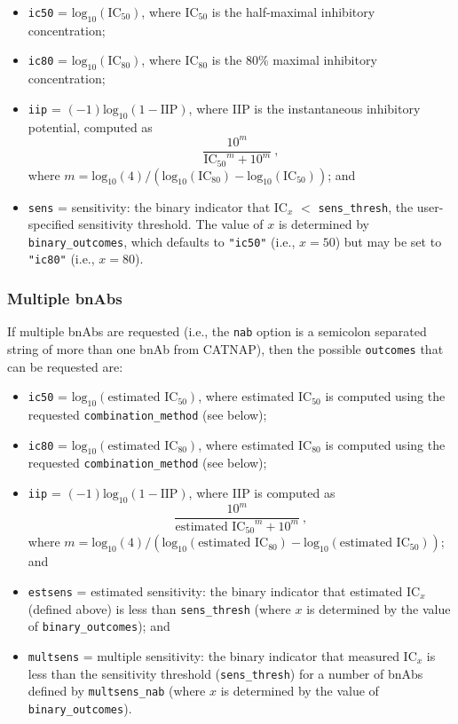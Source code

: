 \documentclass[
]{article}
\providecommand{\tightlist}{%
  \setlength{\itemsep}{0pt}\setlength{\parskip}{0pt}}
\begin{document}
\begin{itemize}
\tightlist
\item
  \texttt{ic50} = \(\mbox{log}_{10}(\mbox{IC}_{50})\), where IC\(_{50}\) is the half-maximal inhibitory concentration;
\item
  \texttt{ic80} = \(\mbox{log}_{10}(\mbox{IC}_{80})\), where IC\(_{80}\) is the 80\% maximal inhibitory concentration;
\item
  \texttt{iip} = \((-1)\mbox{log}_{10}(1 - \mbox{IIP})\), where IIP \citep[\citet{wagh2016optimal}]{shen2008dose} is the instantaneous inhibitory potential, computed as \[ \frac{10^m}{\mbox{IC$_{50}$}^m + 10^m} \ , \] where \(m = \mbox{log}_{10}(4) / (\mbox{log}_{10}(\mbox{IC}_{80}) - \mbox{log}_{10}(\mbox{IC}_{50}))\); and
\item
  \texttt{sens} = sensitivity: the binary indicator that IC\(_{x}\) \(<\) \texttt{sens\_thresh}, the user-specified sensitivity threshold. The value of \(x\) is determined by \texttt{binary\_outcomes}, which defaults to \texttt{"ic50"} (i.e., \(x = 50\)) but may be set to \texttt{"ic80"} (i.e., \(x = 80\)).
\end{itemize}

\hypertarget{multiple-bnabs}{%
\subsubsection{Multiple bnAbs}\label{multiple-bnabs}}

If multiple bnAbs are requested (i.e., the \texttt{nab} option is a semicolon separated string of more than one bnAb from CATNAP), then the possible \texttt{outcomes} that can be requested are:

\begin{itemize}
\tightlist
\item
  \texttt{ic50} = \(\mbox{log}_{10}(\mbox{estimated IC}_{50})\), where estimated IC\(_{50}\) is computed using the requested \texttt{combination\_method} (see below);
\item
  \texttt{ic80} = \(\mbox{log}_{10}(\mbox{estimated IC}_{80})\), where estimated IC\(_{80}\) is computed using the requested \texttt{combination\_method} (see below);
\item
  \texttt{iip} = \((-1)\mbox{log}_{10}(1 - \mbox{IIP})\), where IIP is computed as \[ \frac{10^m}{\mbox{estimated IC$_{50}$}^m + 10^m} \ , \] where \(m = \mbox{log}_{10}(4) / (\mbox{log}_{10}(\mbox{estimated IC}_{80}) - \mbox{log}_{10}(\mbox{estimated IC}_{50}))\); and
\item
  \texttt{estsens} = estimated sensitivity: the binary indicator that estimated IC\(_{x}\) (defined above) is less than \texttt{sens\_thresh} (where \(x\) is determined by the value of \texttt{binary\_outcomes}); and
\item
  \texttt{multsens} = multiple sensitivity: the binary indicator that measured IC\(_{x}\) is less than the sensitivity threshold (\texttt{sens\_thresh}) for a number of bnAbs defined by \texttt{multsens\_nab} (where \(x\) is determined by the value of \texttt{binary\_outcomes}).
\end{itemize}
\end{document}

